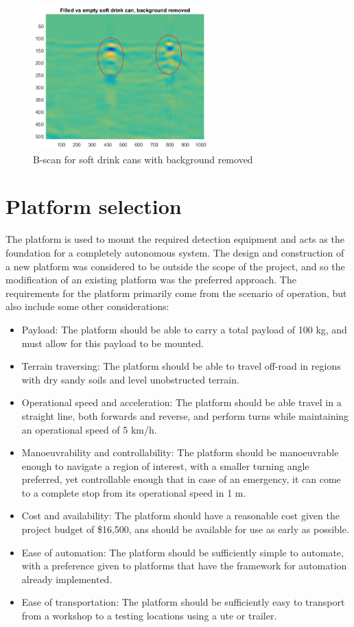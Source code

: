 \documentclass[main.tex]{subfiles}
\begin{document}
\begin{figure}[!ht]
\includegraphics[width=0.6\textwidth]{3-ConceptDesign/cansNoBG.PNG}
\centering
\caption{B-scan for soft drink cans with background removed} 
\end{figure}

\section{Platform selection}
The platform is used to mount the required detection equipment and acts as the foundation for a completely autonomous system. The design and construction of a new platform was considered to be outside the scope of the project, and so the modification of an existing platform was the preferred approach. The requirements for the platform primarily come from the scenario of operation, but also include some other considerations: 

\begin{itemize}
 \item Payload: The platform should be able to carry a total payload of 100 kg, and must allow for this payload to be mounted.
 \item Terrain traversing: The platform should be able to travel off-road in regions with dry sandy soils and level unobstructed terrain.
\item  Operational speed and acceleration: The platform should be able travel in a straight line, both forwards and reverse, and perform turns while maintaining an operational speed of 5 km/h.
\item Manoeuvrability and controllability: The platform should be manoeuvrable enough to navigate a region of interest, with a smaller turning angle preferred, yet controllable enough that in case of an emergency, it can come to a complete stop from its operational speed in 1 m.
\item Cost and availability: The platform should have a reasonable cost given the project budget of \$16,500, ans should be available for use as early as possible. 
\item Ease of automation: The platform should be sufficiently simple to automate, with a preference given to platforms that have the framework for automation already implemented. 
\item Ease of transportation: The platform should be sufficiently easy to transport from a workshop to a testing locations using a ute or trailer.
\end{itemize}
\end{document}
